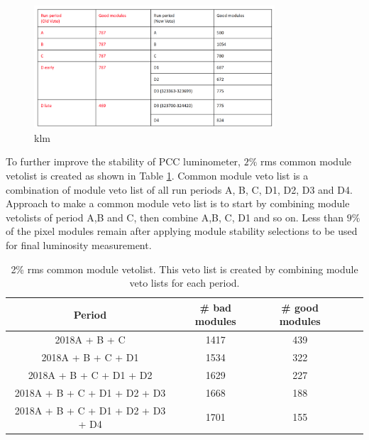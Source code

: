 \begin{figure}[!htp]
\centering
\includegraphics[width=0.8\textwidth]{ashish_thesis/old_new_veto.png}
\caption{%
   klm
}
\label{fig:old_new_vetolist}
\end{figure}









To further improve the stability of PCC luminometer, $2\%$ rms common module vetolist is created as shown in Table \ref{tab:2commonveto}. Common module veto list is a combination of module veto list of all run periods A, B, C, D1, D2, D3 and D4. Approach to make a common module veto list is to start by combining module vetolists of period A,B and C, then combine A,B, C, D1 and so on. Less than $9\%$ of the pixel modules remain after applying module stability selections to be used for final luminosity measurement. 

\begin{table}
  \begin{center}
    \begin{tabular}{ccccc}  
    \textbf{Period}   & \textbf{\# bad modules} & \textbf{\# good modules} \\  \hline
     2018A + B + C      &  1417   &  439    \\  
     2018A + B + C + D1      &   1534  &   322    \\ 
     2018A + B + C + D1 + D2      &   1629 &    227   \\ 
     2018A + B + C + D1 + D2 + D3     &   1668 &   188    \\ 
     2018A + B + C + D1 + D2 + D3 + D4     &  1701 &     155  \\ 
      \end{tabular}
    \caption[Common module veto list for all periods]{2\% rms common module vetolist. This veto list is created by combining module veto lists for each period.}
    \label{tab:2commonveto}
  \end{center}
\end{table}




